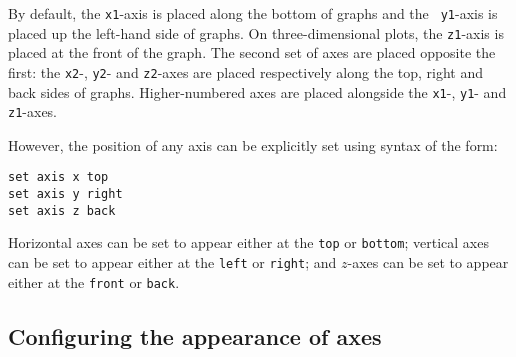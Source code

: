 By default, the {\tt x1}-axis is placed along the bottom of graphs and the {\tt
y1}-axis is placed up the left-hand side of graphs. On three-dimensional plots,
the {\tt z1}-axis is placed at the front of the graph. The second set of axes
are placed opposite the first: the {\tt x2}-, {\tt y2}- and {\tt z2}-axes are
placed respectively along the top, right and back sides of graphs.
Higher-numbered axes are placed alongside the {\tt x1}-, {\tt y1}- and {\tt
z1}-axes.

However, the position of any axis can be explicitly set using syntax of the
form:
\begin{verbatim}
set axis x top
set axis y right
set axis z back
\end{verbatim}
Horizontal axes can be set to appear either at the {\tt top} or {\tt bottom};
vertical axes can be set to appear either at the {\tt left} or {\tt right}; and
$z$-axes can be set to appear either at the {\tt front} or {\tt back}.

\subsection{Configuring the appearance of axes}

